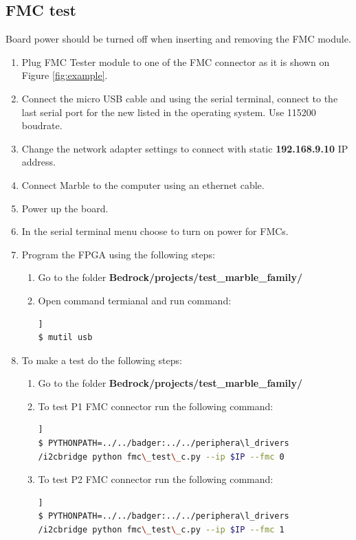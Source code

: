 \documentclass[12pt,oneside,a4]{article}
\begin{document}
\subsection{FMC test}
\begin{leftbar}
Board power should be turned off when inserting and removing the FMC module.
\end{leftbar}
\begin{enumerate}
	\item Plug FMC Tester module to one of the FMC connector as it is shown on Figure \ref{fig:example}.
	\item Connect the micro USB cable and using the serial terminal, connect to the last serial port for the new listed in the operating system. Use 115200 boudrate.
	\item Change the network adapter settings to connect with static \textbf{192.168.9.10} IP address.
    \item Connect Marble to the computer using an ethernet cable.
    \item Power up the board.
    \item In the serial terminal menu choose  to turn on power for FMCs.
	\item Program the FPGA using the following steps:
	\begin{enumerate}
	\item Go to the folder \textbf{Bedrock/projects/test\_marble\_family/}
	\item Open command termianal and run command:
	\begin{lstlisting}[backgroundcolor = \color{Gainsboro}, language=bash, frame=none]]
$ mutil usb
	\end{lstlisting}
	\end{enumerate}
	\item To make a test do the following steps:
	\begin{enumerate}
	\item Go to the folder \textbf{Bedrock/projects/test\_marble\_family/}
	\item To test P1 FMC connector run the following command:
	\begin{lstlisting}[backgroundcolor = \color{Gainsboro}, language=bash, frame=none]]
$ PYTHONPATH=../../badger:../../periphera\l_drivers
/i2cbridge python fmc\_test\_c.py --ip $IP --fmc 0
	\end{lstlisting}
	\item To test P2 FMC connector run the following command:
	\begin{lstlisting}[backgroundcolor = \color{Gainsboro}, language=bash, frame=none]]
$ PYTHONPATH=../../badger:../../periphera\l_drivers
/i2cbridge python fmc\_test\_c.py --ip $IP --fmc 1
	\end{lstlisting}
	\end{enumerate}
\end{enumerate}
\end{document}

